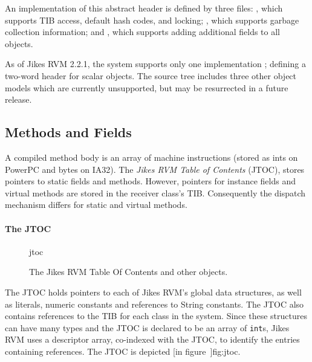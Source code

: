 An implementation of this abstract header is defined by three files: 
, which supports
TIB access, default hash codes, and locking; 
, which
supports garbage collection information; 
and 
, which supports
adding additional fields to all objects. 

As of Jikes RVM 2.2.1, the system supports only one implementation
; 
defining a two-word header for scalar objects.  The source tree includes
three other object models which are currently unsupported, but may be
resurrected in a future release.

\JavaTMFooter

\JikesTMFooter

\subsection{Methods and Fields}\label{sssec:methods}
A compiled method body is an array of machine instructions (stored as
ints on PowerPC and bytes on IA32). 
The {\em Jikes RVM Table of Contents} (JTOC),
stores pointers to static fields and methods.  However, 
pointers for instance fields and virtual methods are stored in the receiver 
class's TIB.  Consequently the dispatch mechanism differs for static and virtual 
methods.

\paragraph{The JTOC}
\begin{figure}[htb]
\begin{gif}{jtoc}
\vbox{
\hbox{}
}\hfil
\end{gif}
\caption{The Jikes RVM Table Of Contents and other objects.}
\label{fig:jtoc}
\end{figure}
The JTOC holds pointers to 
each of Jikes\TMweb{} RVM's global data structures, as well as
literals, numeric constants and references to String constants.
The JTOC also
contains references to the TIB for each class in the system.  
Since these 
structures can have many types and the JTOC is declared to be an array of 
{\tt int}s,  
Jikes RVM uses a descriptor array, co-indexed with the JTOC, 
to identify the entries containing references.
The JTOC
is depicted [in figure~\Ref]{fig:jtoc}.  

